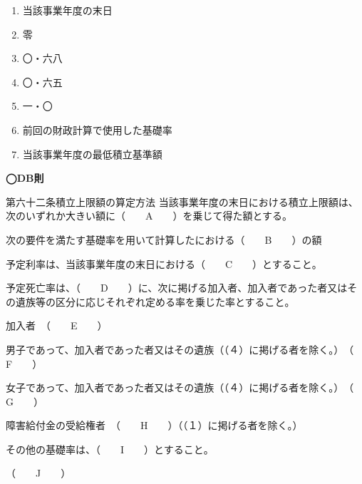 \begin{answerbox}
  \begin{enumerate}[A: ]
    \item 当該事業年度の末日
    \item 零
    \item 〇・六八
    \item 〇・六五
    \item 一・〇
    \item 前回の財政計算で使用した基礎率
    \item 当該事業年度の最低積立基準額
  \end{enumerate}
\end{answerbox}


\begin{fillblank}
    \noindent \textbf{◯DB則}
  \begin{lawstructure}
    \begin{lawarticle}{第六十二条}{積立上限額の算定方法}
      当該事業年度の末日における積立上限額は、次のいずれか大きい額に（　　A　　）を乗じて得た額とする。

      次の要件を満たす基礎率を用いて計算したにおける（　　B　　）の額

      予定利率は、当該事業年度の末日における（　　C　　）とすること。

      予定死亡率は、（　　D　　）に、次に掲げる加入者、加入者であった者又はその遺族等の区分に応じそれぞれ定める率を乗じた率とすること。

      加入者　（　　E　　）

      男子であって、加入者であった者又はその遺族（（４）に掲げる者を除く。）　（　　F　　）

      女子であって、加入者であった者又はその遺族（（４）に掲げる者を除く。）　（　　G　　）

      障害給付金の受給権者　（　　H　　）（（１）に掲げる者を除く。）

      その他の基礎率は、（　　I　　）とすること。

      （　　J　　）
    \end{lawarticle}
  \end{lawstructure}
\end{fillblank}

